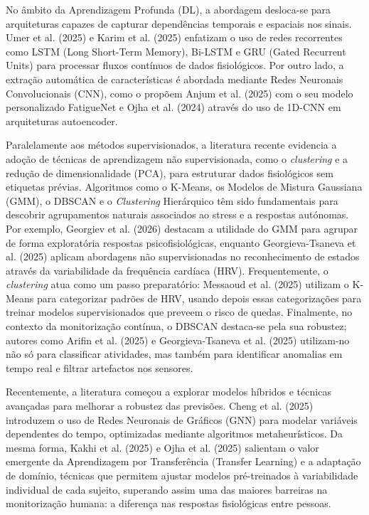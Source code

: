 No âmbito da Aprendizagem Profunda (DL), a abordagem desloca-se para arquiteturas capazes de capturar dependências temporais e espaciais nos sinais. Umer et al. (2025) e Karim et al. (2025)\cite{umer2025,karim2025} enfatizam o uso de redes recorrentes como LSTM (Long Short-Term Memory), Bi-LSTM e GRU (Gated Recurrent Units) para processar fluxos contínuos de dados fisiológicos. Por outro lado, a extração automática de características é abordada mediante Redes Neuronais Convolucionais (CNN), como o propõem Anjum et al. (2025) com o seu modelo personalizado FatigueNet e Ojha et al. (2024)\cite{anjum2025,ojha2024} através do uso de 1D-CNN em arquiteturas autoencoder.

Paralelamente aos métodos supervisionados, a literatura recente evidencia a adoção de técnicas de aprendizagem não supervisionada, como o \textit{clustering} e a redução de dimensionalidade (PCA), para estruturar dados fisiológicos sem etiquetas prévias. Algoritmos como o K-Means, os Modelos de Mistura Gaussiana (GMM), o DBSCAN e o \textit{Clustering} Hierárquico têm sido fundamentais para descobrir agrupamentos naturais associados ao stress e a respostas autónomas. Por exemplo, Georgiev et al. (2026)\cite{georgiev2026} destacam a utilidade do GMM para agrupar de forma exploratória respostas psicofisiológicas, enquanto Georgieva-Tsaneva et al. (2025)\cite{georgieva2025} aplicam abordagens não supervisionadas no reconhecimento de estados através da variabilidade da frequência cardíaca (HRV). Frequentemente, o \textit{clustering} atua como um passo preparatório: Messaoud et al. (2025)\cite{messaoud2025} utilizam o K-Means para categorizar padrões de HRV, usando depois essas categorizações para treinar modelos supervisionados que preveem o risco de quedas. Finalmente, no contexto da monitorização contínua, o DBSCAN destaca-se pela sua robustez; autores como Arifin et al. (2025)\cite{arifin2025} e Georgieva-Tsaneva et al. (2025)\cite{georgieva2025} utilizam-no não só para classificar atividades, mas também para identificar anomalias em tempo real e filtrar artefactos nos sensores.

Recentemente, a literatura começou a explorar modelos híbridos e técnicas avançadas para melhorar a robustez das previsões. Cheng et al. (2025) introduzem o uso de Redes Neuronais de Gráficos (GNN) para modelar variáveis dependentes do tempo, optimizadas mediante algoritmos metaheurísticos\cite{cheng2025}. Da mesma forma, Kakhi et al. (2025) e Ojha et al. (2025)\cite{kakhi2025,ojha2024} salientam o valor emergente da Aprendizagem por Transferência (Transfer Learning) e a adaptação de domínio, técnicas que permitem ajustar modelos pré-treinados à variabilidade individual de cada sujeito, superando assim uma das maiores barreiras na monitorização humana: a diferença nas respostas fisiológicas entre pessoas.

